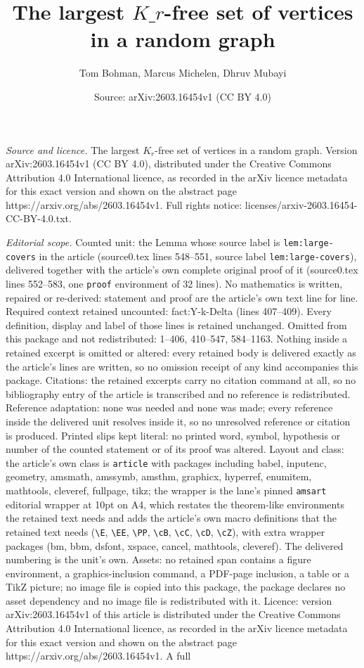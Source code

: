 \documentclass[10pt,a4paper]{amsart}
\title[The largest $K\_r$-free set of vertices in a random graph]{The largest $K\_r$-free set of vertices in a random graph}
\author{Tom Bohman, Marcus Michelen, Dhruv Mubayi}
\date{Source: arXiv:2603.16454v1 (CC BY 4.0)}
\begin{document}
\maketitle

\noindent\emph{Source and licence.} The largest $K_r$-free set of vertices in a random graph. Version arXiv:2603.16454v1 (CC BY 4.0), distributed under the Creative Commons Attribution 4.0 International licence, as recorded in the arXiv licence metadata for this exact version and shown on the abstract page https://arxiv.org/abs/2603.16454v1. Full rights notice: licenses/arxiv-2603.16454-CC-BY-4.0.txt.\par\smallskip

\noindent\textit{Editorial scope.} Counted unit: the Lemma whose source label is \texttt{lem:large-covers} in the article (source0.tex lines 548--551, source label \texttt{lem:large-covers}), delivered together with the article's own complete original proof of it (source0.tex lines 552--583, one \texttt{proof} environment of 32 lines). No mathematics is written, repaired or re-derived: statement and proof are the article's own text line for line. Required context retained uncounted: fact:Y-k-Delta (lines 407--409). Every definition, display and label of those lines is retained unchanged. Omitted from this package and not redistributed: 1--406, 410--547, 584--1163. Nothing inside a retained excerpt is omitted or altered: every retained body is delivered exactly as the article's lines are written, so no omission receipt of any kind accompanies this package. Citations: the retained excerpts carry no citation command at all, so no bibliography entry of the article is transcribed and no reference is redistributed. Reference adaptation: none was needed and none was made; every reference inside the delivered unit resolves inside it, so no unresolved reference or citation is produced. Printed slips kept literal: no printed word, symbol, hypothesis or number of the counted statement or of its proof was altered. Layout and class: the article's own class is \texttt{article} with packages including babel, inputenc, geometry, amsmath, amssymb, amsthm, graphicx, hyperref, enumitem, mathtools, cleveref, fullpage, tikz; the wrapper is the lane's pinned \texttt{amsart} editorial wrapper at 10pt on A4, which restates the theorem-like environments the retained text needs and adds the article's own macro definitions that the retained text needs (\texttt{\textbackslash E}, \texttt{\textbackslash EE}, \texttt{\textbackslash PP}, \texttt{\textbackslash cB}, \texttt{\textbackslash cC}, \texttt{\textbackslash cD}, \texttt{\textbackslash cZ}), with extra wrapper packages (bm, bbm, dsfont, xspace, cancel, mathtools, cleveref). The delivered numbering is the unit's own. Assets: no retained span contains a figure environment, a graphics-inclusion command, a PDF-page inclusion, a table or a TikZ picture; no image file is copied into this package, the package declares no asset dependency and no image file is redistributed with it. Licence: version arXiv:2603.16454v1 of this article is distributed under the Creative Commons Attribution 4.0 International licence, as recorded in the arXiv licence metadata for this exact version and shown on the abstract page https://arxiv.org/abs/2603.16454v1. A full 
\end{document}
